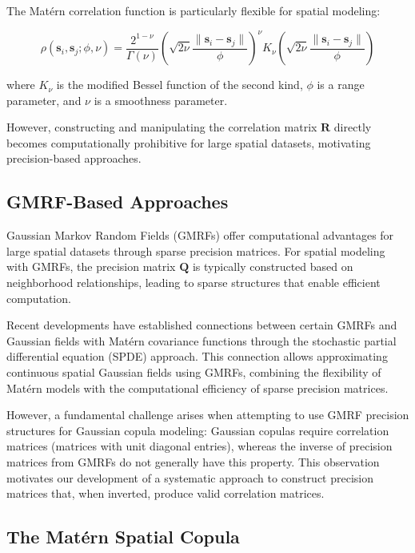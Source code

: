 The Matérn correlation function is particularly flexible for spatial modeling:

\begin{equation}
\rho(\mathbf{s}_i, \mathbf{s}_j; \phi, \nu) = \frac{2^{1-\nu}}{\Gamma(\nu)}\left(\sqrt{2\nu}\frac{\|\mathbf{s}_i - \mathbf{s}_j\|}{\phi}\right)^{\nu}K_{\nu}\left(\sqrt{2\nu}\frac{\|\mathbf{s}_i - \mathbf{s}_j\|}{\phi}\right)
\end{equation}

where $K_{\nu}$ is the modified Bessel function of the second kind, $\phi$ is a range parameter, and $\nu$ is a smoothness parameter.

However, constructing and manipulating the correlation matrix $\mathbf{R}$ directly becomes computationally prohibitive for large spatial datasets, motivating precision-based approaches.

\subsection{GMRF-Based Approaches}
Gaussian Markov Random Fields (GMRFs) offer computational advantages for large spatial datasets through sparse precision matrices. For spatial modeling with GMRFs, the precision matrix $\mathbf{Q}$ is typically constructed based on neighborhood relationships, leading to sparse structures that enable efficient computation.

Recent developments have established connections between certain GMRFs and Gaussian fields with Matérn covariance functions through the stochastic partial differential equation (SPDE) approach. This connection allows approximating continuous spatial Gaussian fields using GMRFs, combining the flexibility of Matérn models with the computational efficiency of sparse precision matrices.

However, a fundamental challenge arises when attempting to use GMRF precision structures for Gaussian copula modeling: Gaussian copulas require correlation matrices (matrices with unit diagonal entries), whereas the inverse of precision matrices from GMRFs do not generally have this property. This observation motivates our development of a systematic approach to construct precision matrices that, when inverted, produce valid correlation matrices.

\subsection{The Matérn Spatial Copula}

